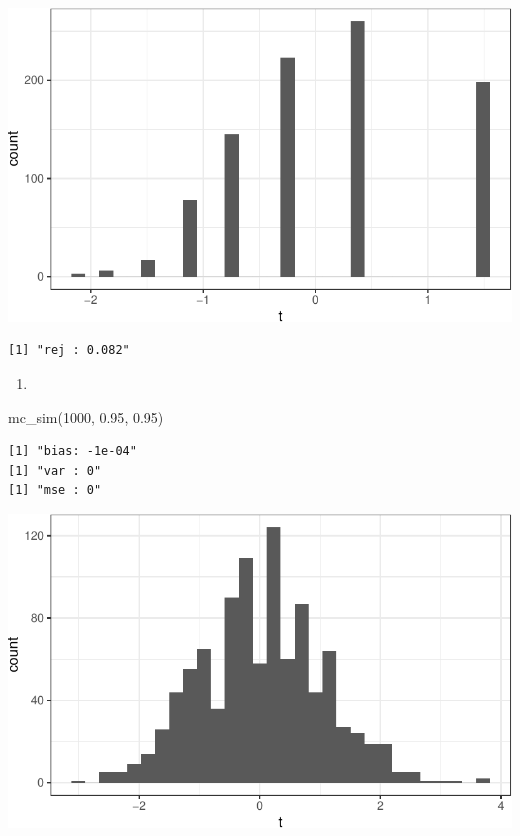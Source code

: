\documentclass[
  letterpaper,
  DIV=11,
  numbers=noendperiod]{scrreprt}
\newenvironment{Shaded}{\begin{snugshade}}{\end{snugshade}}
\newcommand{\DecValTok}[1]{\textcolor[rgb]{0.68,0.00,0.00}{#1}}
\newcommand{\FloatTok}[1]{\textcolor[rgb]{0.68,0.00,0.00}{#1}}
\newcommand{\FunctionTok}[1]{\textcolor[rgb]{0.28,0.35,0.67}{#1}}
\newcommand{\NormalTok}[1]{\textcolor[rgb]{0.00,0.23,0.31}{#1}}
\providecommand{\tightlist}{%
  \setlength{\itemsep}{0pt}\setlength{\parskip}{0pt}}\usepackage{longtable,booktabs,array}
\begin{document}
\includegraphics{07-inference_files/figure-pdf/unnamed-chunk-16-1.pdf}

\begin{verbatim}
[1] "rej : 0.082"
\end{verbatim}

\begin{enumerate}
\def\labelenumi{\arabic{enumi}.}
\setcounter{enumi}{9}
\tightlist
\item
\end{enumerate}

\begin{Shaded}
\begin{Highlighting}[]
\FunctionTok{mc\_sim}\NormalTok{(}\DecValTok{1000}\NormalTok{, }\FloatTok{0.95}\NormalTok{, }\FloatTok{0.95}\NormalTok{)}
\end{Highlighting}
\end{Shaded}

\begin{verbatim}
[1] "bias: -1e-04"
[1] "var : 0"
[1] "mse : 0"
\end{verbatim}

\includegraphics{07-inference_files/figure-pdf/unnamed-chunk-17-1.pdf}
\end{document}
